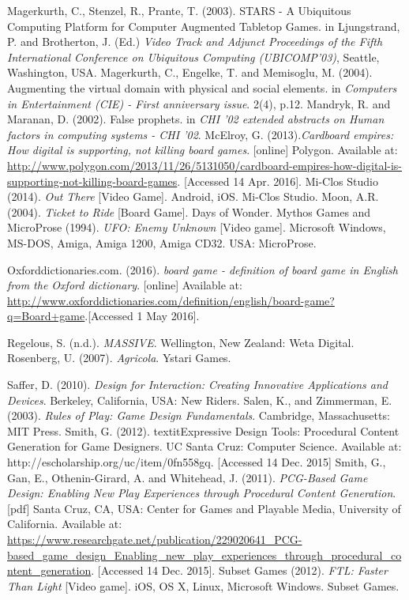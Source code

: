 \documentclass[a4paper,11pt]{report}
\begin{document}
\begin{thebibliography}{1}
Magerkurth, C., Stenzel, R., Prante, T. (2003). STARS - A Ubiquitous Computing Platform for Computer Augmented Tabletop Games. in Ljungstrand, P. and Brotherton, J. (Ed.) \textit{Video Track and Adjunct Proceedings of the Fifth
International Conference on Ubiquitous Computing (UBICOMP’03)}, Seattle, Washington, USA.
Magerkurth, C., Engelke, T. and Memisoglu, M. (2004). Augmenting the virtual domain with physical and social elements. in \textit{Computers in Entertainment (CIE) - First anniversary issue}. 2(4), p.12. 
Mandryk, R. and Maranan, D. (2002). False prophets. in \textit{CHI '02 extended abstracts on Human factors in computing systems - CHI '02}.
McElroy, G. (2013).\textit{Cardboard empires: How digital is supporting, not killing board games}. [online] Polygon. Available at: \url{http://www.polygon.com/2013/11/26/5131050/cardboard-empires-how-digital-is-supporting-not-killing-board-games}. [Accessed 14 Apr. 2016].
Mi-Clos Studio (2014). \textit{Out There} [Video Game]. Android, iOS. Mi-Clos Studio.
Moon, A.R. (2004). \textit{Ticket to Ride} [Board Game]. Days of Wonder.
Mythos Games and MicroProse (1994). \textit{UFO: Enemy Unknown} [Video game]. Microsoft Windows, MS-DOS, Amiga, Amiga 1200, Amiga CD32. USA: MicroProse.

Oxforddictionaries.com. (2016). \textit{board game - definition of board game in English from the Oxford dictionary}. [online] Available at:  \url{http://www.oxforddictionaries.com/definition/english/board-game?q=Board+game}.[Accessed 1 May 2016].

Regelous, S. (n.d.). \textit{MASSIVE}. Wellington, New Zealand: Weta Digital.
Rosenberg, U. (2007). \textit{Agricola}. Ystari Games.

Saffer, D. (2010). \textit{Design for Interaction: Creating Innovative Applications and Devices}. Berkeley, California, USA: New Riders.
Salen, K., and Zimmerman, E. (2003). \textit{Rules of Play: Game Design Fundamentals}. Cambridge, Massachusetts: MIT Press.
Smith, G. (2012). textit{Expressive Design Tools: Procedural Content Generation for Game Designers}. UC Santa Cruz: Computer Science. Available at: http://escholarship.org/uc/item/0fn558gq. [Accessed 14 Dec. 2015]
Smith, G., Gan, E., Othenin-Girard, A. and Whitehead, J. (2011). \textit{PCG-Based Game Design: Enabling New Play Experiences through Procedural Content Generation}. [pdf] Santa Cruz, CA, USA: Center for Games and Playable Media, University of California. Available at: \url{https://www.researchgate.net/publication/229020641_PCG-based_game_design_Enabling_new_play_experiences_through_procedural_content_generation}. [Accessed 14 Dec. 2015].
Subset Games (2012). \textit{FTL: Faster Than Light} [Video game]. iOS, OS X, Linux, Microsoft Windows. Subset Games.



\end{thebibliography}
\end{document}
